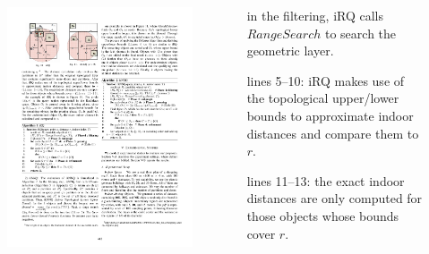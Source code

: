 \begin{frame}
\begin{columns}[c]

  \begin{figure}[tb]
    \includegraphics[width=\columnwidth]{figures/2-6/2-6-14.pdf}
  \end{figure}

  \begin{sitemize}
    \item in the filtering, iRQ calls $RangeSearch$ to search the geometric layer.
    \item lines 5--10: iRQ makes use of the topological upper/lower bounds to approximate indoor distances and compare them to $r$.
    \item lines 11--13: the exact indoor distances are only computed for those objects whose bounds cover $r$.
  \end{sitemize}

\end{columns}

\end{frame}

